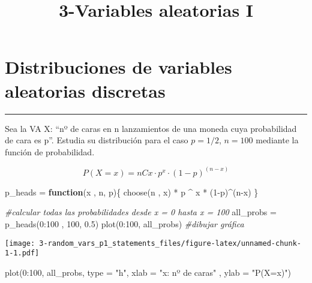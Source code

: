 \documentclass[
]{article}
\title{3-Variables aleatorias I}
\author{}
\date{\vspace{-2.5em}}
\newenvironment{Shaded}{\begin{snugshade}}{\end{snugshade}}
\newcommand{\AttributeTok}[1]{\textcolor[rgb]{0.77,0.63,0.00}{#1}}
\newcommand{\CommentTok}[1]{\textcolor[rgb]{0.56,0.35,0.01}{\textit{#1}}}
\newcommand{\ControlFlowTok}[1]{\textcolor[rgb]{0.13,0.29,0.53}{\textbf{#1}}}
\newcommand{\DecValTok}[1]{\textcolor[rgb]{0.00,0.00,0.81}{#1}}
\newcommand{\FloatTok}[1]{\textcolor[rgb]{0.00,0.00,0.81}{#1}}
\newcommand{\FunctionTok}[1]{\textcolor[rgb]{0.00,0.00,0.00}{#1}}
\newcommand{\NormalTok}[1]{#1}
\newcommand{\OtherTok}[1]{\textcolor[rgb]{0.56,0.35,0.01}{#1}}
\newcommand{\SpecialCharTok}[1]{\textcolor[rgb]{0.00,0.00,0.00}{#1}}
\newcommand{\StringTok}[1]{\textcolor[rgb]{0.31,0.60,0.02}{#1}}
\begin{document}
\maketitle

\hypertarget{distribuciones-de-variables-aleatorias-discretas}{%
\section{Distribuciones de variables aleatorias
discretas}\label{distribuciones-de-variables-aleatorias-discretas}}

\begin{center}\rule{0.5\linewidth}{0.5pt}\end{center}

Sea la VA X: ``nº de caras en n lanzamientos de una moneda cuya
probabilidad de cara es p''. Estudia su distribución para el caso
\(p=1/2\), \(n=100\) mediante la función de probabilidad.

\[P(X=x) = nCx\cdot p^x \cdot (1-p)^(n-x)\]

\begin{Shaded}
\begin{Highlighting}[]
\NormalTok{p\_heads }\OtherTok{=} \ControlFlowTok{function}\NormalTok{(x , n, p)\{}
  \FunctionTok{choose}\NormalTok{(n , x) }\SpecialCharTok{*}\NormalTok{ p }\SpecialCharTok{\^{}}\NormalTok{ x }\SpecialCharTok{*}\NormalTok{ (}\DecValTok{1}\SpecialCharTok{{-}}\NormalTok{p)}\SpecialCharTok{\^{}}\NormalTok{(n}\SpecialCharTok{{-}}\NormalTok{x)  }
\NormalTok{\}}

\CommentTok{\#calcular todas las probabilidades desde x = 0 hasta x = 100}
\NormalTok{  all\_probs }\OtherTok{=} \FunctionTok{p\_heads}\NormalTok{(}\DecValTok{0}\SpecialCharTok{:}\DecValTok{100}\NormalTok{ , }\DecValTok{100}\NormalTok{, }\FloatTok{0.5}\NormalTok{)}
  \FunctionTok{plot}\NormalTok{(}\DecValTok{0}\SpecialCharTok{:}\DecValTok{100}\NormalTok{, all\_probs) }\CommentTok{\#dibujar gráfica}
\end{Highlighting}
\end{Shaded}

\texttt{[image: 3-random\_vars\_p1\_statements\_files/figure-latex/unnamed-chunk-1-1.pdf]}

\begin{Shaded}
\begin{Highlighting}[]
  \FunctionTok{plot}\NormalTok{(}\DecValTok{0}\SpecialCharTok{:}\DecValTok{100}\NormalTok{, all\_probs, }\AttributeTok{type =} \StringTok{"h"}\NormalTok{, }\AttributeTok{xlab =} \StringTok{"x: nº de caras"}\NormalTok{ , }\AttributeTok{ylab =} \StringTok{"P(X=x)"}\NormalTok{)}
\end{Highlighting}
\end{Shaded}
\end{document}
